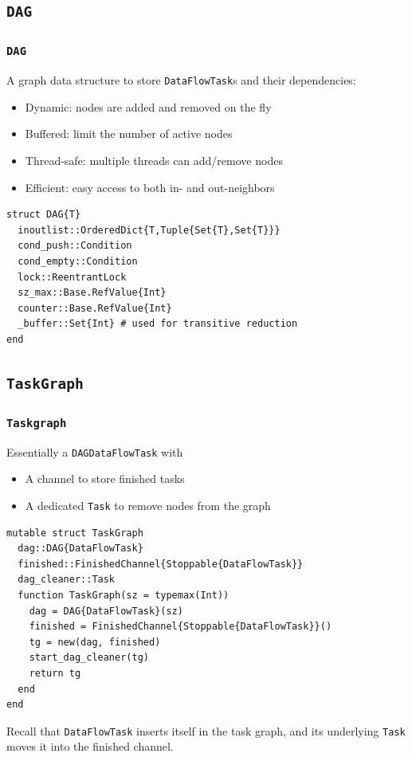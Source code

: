 \documentclass{beamer}
\begin{document}
\subsection{\texttt{DAG}}

\begin{frame}[fragile]
\frametitle{{\texttt{DAG}}}  

A graph data structure to store \texttt{DataFlowTask}s and their
dependencies:

\begin{itemize}
  \item Dynamic: nodes are added and removed on the fly
  \item Buffered: limit the number of active nodes
  \item Thread-safe: multiple threads can add/remove nodes
  \item Efficient: easy access to both in- and out-neighbors
\end{itemize}

\hrulefill
\begin{verbatim}
struct DAG{T}
  inoutlist::OrderedDict{T,Tuple{Set{T},Set{T}}}
  cond_push::Condition
  cond_empty::Condition
  lock::ReentrantLock
  sz_max::Base.RefValue{Int}
  counter::Base.RefValue{Int}
  _buffer::Set{Int} # used for transitive reduction
end
\end{verbatim}
  
\end{frame}

\subsection{\texttt{TaskGraph}}

\begin{frame}[fragile]
\frametitle{{\texttt{Taskgraph}}}  
  
Essentially a \texttt{DAG{DataFlowTask}} with
\begin{itemize}
  \item A channel to store finished tasks  
  \item A dedicated \texttt{Task} to remove nodes from the graph
\end{itemize}

\hrulefill
\begin{verbatim}
mutable struct TaskGraph
  dag::DAG{DataFlowTask}
  finished::FinishedChannel{Stoppable{DataFlowTask}}
  dag_cleaner::Task
  function TaskGraph(sz = typemax(Int))
    dag = DAG{DataFlowTask}(sz)
    finished = FinishedChannel{Stoppable{DataFlowTask}}()
    tg = new(dag, finished)
    start_dag_cleaner(tg)
    return tg
  end
end
\end{verbatim}

\begin{alertblock}{}
\small{Recall that \texttt{DataFlowTask} inserts itself in the task
graph, and its underlying \texttt{Task} moves it into the finished
channel.}
\end{alertblock}
  
\end{frame}
\end{document}
